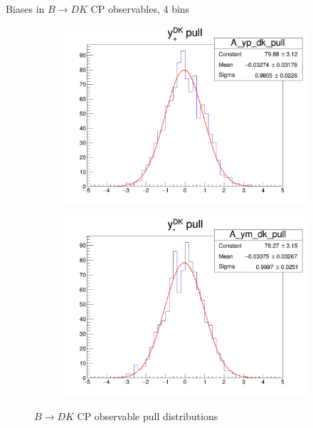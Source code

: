 \documentclass{beamer}
\begin{document}
\begin{frame}{Biases in $B\to DK$ CP observables, $4$ bins}
\begin{figure}
\begin{subfigure}{0.42\textwidth}
    \end{subfigure}
    \begin{subfigure}{0.42\textwidth}
      \includegraphics[width = 1.0\textwidth]{A_yp_dk_4Bins_pull.png}
    \end{subfigure}%
    \begin{subfigure}{0.42\textwidth}
      \includegraphics[width = 1.0\textwidth]{A_ym_dk_4Bins_pull.png}
    \end{subfigure}
    \caption{$B\to DK$ CP observable pull distributions}
  \end{figure}
\end{frame}
\end{document}

